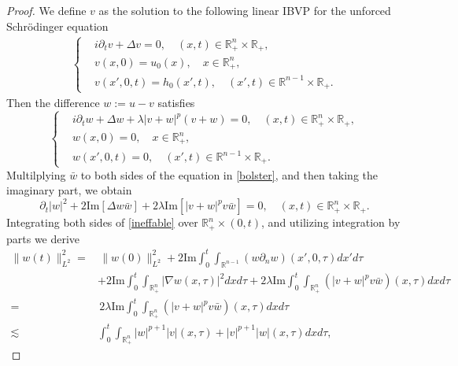 \documentclass[preprint,compress,12pt]{elsarticle}
\numberwithin{equation}{section}
\begin{document}
\begin{proof}
	We define $v$ as the solution to the following linear IBVP for the unforced Schr\"{o}dinger equation
	\begin{align}\label{coagulate}
		\left\{\begin{aligned}
			&	i\partial_{t}v+\Delta v=0, \quad (x, t) \in \mathbb{R}_{+}^{n} \times \mathbb{R}_{+}, \\
			&v(x,0)=u_0(x), \quad x\in\mathbb{R}^{n}_{+},\\& v(x',0,t)=h_{0}(x',t), \quad  (x',t)\in \mathbb{R}^{n-1}\times \mathbb{R}_{+}.
		\end{aligned}
		\right.				
	\end{align}
	Then the difference $w:=u-v$ satisfies
	\begin{equation}\label{bolster}
		\left\{\begin{aligned}
			&i\partial_{t}w+\Delta w + \lambda |v+w|^{p} (v+w)=0, \quad (x,t) \in \mathbb{R}^{n}_{+} \times \mathbb{R}_{+},\\
			&w(x,0)=0, \quad x\in\mathbb{R}^{n}_{+},\\& w(x',0,t)=0, \quad  (x',t)\in \mathbb{R}^{n-1}\times \mathbb{R}_{+}.
		\end{aligned}
		\right.
	\end{equation}
	Multilplying $\bar{w}$ to both sides of the equation in \eqref{bolster}, and then taking the imaginary part, we obtain
	\begin{equation}\label{ineffable}
		\partial_{t} |w|^{2} + 2\text{Im} [\Delta w \bar{w}]+ 2\lambda\text{Im}[|v+w|^{p} v \bar{w}]=0, \quad (x,t) \in \mathbb{R}^{n}_{+} \times \mathbb{R}_{+}.
	\end{equation}
	Integrating both sides of \eqref{ineffable} over $\mathbb{R}^{n}_{+}\times (0,t)$, and utilizing integration by parts we derive
	\begin{equation}\label{pulchritudinous}
		\begin{aligned}
			\|w(t)\|_{L^{2}}^{2}=&\,\|w(0)\|_{L^{2}}^{2}+ 2\text{Im}\int_{0}^{t} \int_{\mathbb{R}^{n-1}} (w\partial_{n} w)(x',0,\tau) dx'd\tau \\&+2\text{Im}\int_{0}^{t}\int_{\mathbb{R}^{n}_{+}}  |\nabla  w(x,\tau)|^{2}dxd\tau+ 2\lambda  \text{Im}    \int_{0}^{t} \int_{\mathbb{R}^{n}_{+}} (|v+w|^{p}v\bar{w}) (x,\tau) dxd\tau\\=&\,2\lambda  \text{Im}    \int_{0}^{t} \int_{\mathbb{R}^{n}_{+}} (|v+w|^{p}v\bar{w})(x,\tau) dxd\tau\\\lesssim&\int_{0}^{t}\int_{\mathbb{R}^{n}_{+}} |w|^{p+1} |v| (x,\tau)+ |v|^{p+1} |w| (x,\tau)dx d\tau,

\end{aligned}
\end{equation}
\end{proof}
\end{document}
